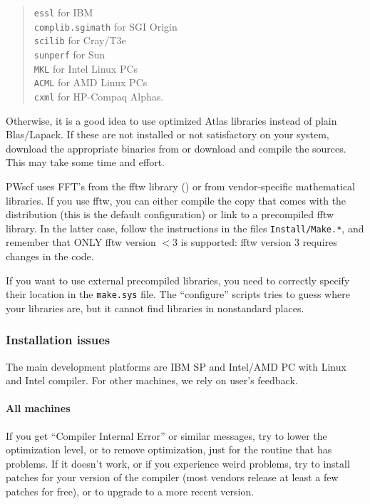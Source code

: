\documentclass[12pt]{article}
\begin{document}
\begin{quote}
{\tt essl} for IBM\\
{\tt complib.sgimath} for SGI Origin\\
{\tt scilib} for Cray/T3e\\
{\tt sunperf} for Sun\\
{\tt MKL} for Intel Linux PCs\\
{\tt ACML} for AMD Linux PCs\\
{\tt cxml} for HP-Compaq Alphas.
\end{quote}

Otherwise, it is a good idea to use optimized Atlas libraries instead of
plain Blas/Lapack. If these are not installed or not satisfactory on
your system, download the appropriate binaries from
 or
download and compile the sources. This may take some time and effort.

PWscf uses FFT's from the fftw library
() or from
vendor-specific mathematical libraries.  If you use fftw, you can either
compile the copy that comes with the distribution (this is the default
configuration) or link to a precompiled fftw library.  In the latter
case, follow the instructions in the files {\tt Install/Make.*}, and
remember that ONLY fftw version $<3$ is supported: fftw version 3
requires changes in the code.

If you want to use external precompiled libraries, you need to correctly
specify their location in the {\tt make.sys} file.  The ``configure''
scripts tries to guess where your libraries are, but it cannot find
libraries in nonstandard places.

\subsubsection{Installation issues}

The main development platforms are IBM SP and Intel/AMD PC with Linux
and Intel compiler. For other machines, we rely on user's feedback.

\paragraph{All machines}

If you get ``Compiler Internal Error'' or similar messages, try to lower
the optimization level, or to remove optimization, just for the routine
that has problems. If it doesn't work, or if you experience weird
problems, try to install patches for your version of the compiler (most
vendors release at least a few patches for free), or to upgrade to a
more recent version.
\end{document}
